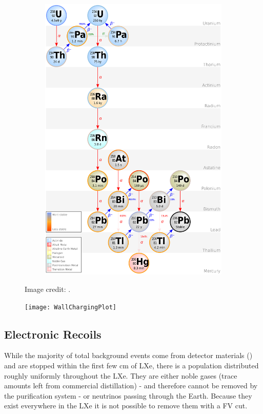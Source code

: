 \begin{figure}
\begin{subfigure}[t]{0.5\textwidth}
        \includegraphics[width=\textwidth]{Decay_Chain_of_Uranium-238}
    \end{subfigure}
    \caption{Image credit: %
    .}
	\label{fig:backgrounds_decay_chains}
\end{figure}

\begin{figure}
\centering
\texttt{[image: WallChargingPlot]}
\label{fig:backgrounds_wall_charge}
\end{figure}


\subsection{Electronic Recoils}
\label{subsec:backgrounds_electronic}
While the majority of total background events come from detector materials () and are stopped
within the first few cm of LXe, there is a population distributed roughly uniformly throughout the LXe.  They are either noble gases (trace
amounts left from commercial distillation) - and therefore cannot be removed by the purification system - or neutrinos passing through the
Earth.  Because they exist everywhere in the LXe it is not possible to remove them with a FV cut.

